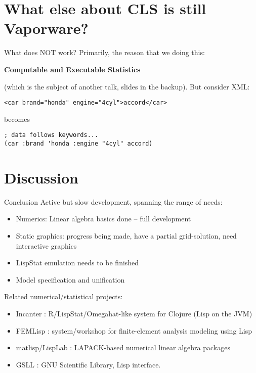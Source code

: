\documentclass{beamer}
\begin{document}
\section{What else about CLS is still Vaporware?}

\begin{frame}[fragile]{What does NOT work?}
  Primarily, the reason that we doing this:
  
  \textbf{Computable and Executable Statistics}

  (which is the subject of another talk, slides in the backup).   But
  consider XML:
\begin{verbatim}
<car brand="honda" engine="4cyl">accord</car>
\end{verbatim}
becomes
\begin{verbatim}
; data follows keywords...
(car :brand 'honda :engine "4cyl" accord)
\end{verbatim}
\end{frame}

\section{Discussion}

\begin{frame}{Conclusion}
  Active but slow development, spanning the range of needs:
  \begin{itemize}
  \item Numerics: Linear algebra basics done -- full development
  \item Static graphics: progress being made, have a partial
    grid-solution, need interactive graphics
  \item LispStat emulation needs to be finished
  \item Model specification and unification 
  \end{itemize}
  Related numerical/statistical projects:
  \begin{itemize}
  \item Incanter : R/LispStat/Omegahat-like system for Clojure (Lisp
    on the JVM)
  \item FEMLisp : system/workshop for finite-element analysis modeling
    using Lisp
  \item matlisp/LispLab : LAPACK-based numerical linear algebra packages
  \item GSLL : GNU Scientific Library, Lisp interface.
  \end{itemize}
\end{frame}
\end{document}
